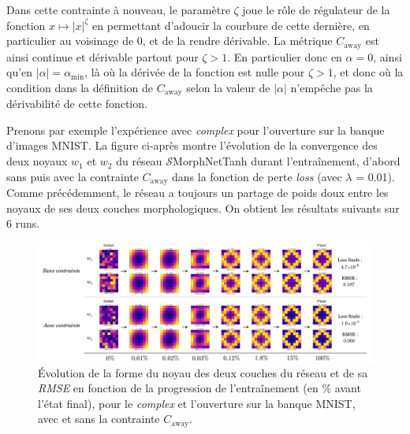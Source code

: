 \vspace{5.0mm}
\noindent Dans cette contrainte à nouveau, le paramètre $\zeta$ joue le rôle de régulateur de la fonction $x \mapsto |x|^\zeta$ en permettant d'adoucir la courbure de cette dernière, en particulier au voisinage de $0$, et de la rendre dérivable.
La métrique $C_\text{away}$ est ainsi continue et dérivable partout pour $\zeta > 1$. En particulier donc en $\alpha = 0$, ainsi qu'en $|\alpha| = \alpha_\text{min}$, là où la dérivée de la fonction est nulle pour $\zeta > 1$, et donc où la condition dans la définition de $C_\text{away}$ selon la valeur de $|\alpha|$ n'empêche pas la dérivabilité de cette fonction.


\newpage

Prenons par exemple l’expérience avec \textit{complex} pour l'ouverture sur la banque d'images MNIST. La figure ci-après montre l’évolution de la convergence des deux noyaux $w_1$ et $w_2$ du réseau $\mathcal{S}$MorphNetTanh durant l’entraînement, d'abord sans puis avec la contrainte $C_\text{away}$ dans la fonction de perte \textit{loss} (avec $\lambda$ = 0.01).
Comme précédemment, le réseau a toujours un partage de poids doux entre les noyaux de ses deux couches morphologiques. On obtient les résultats suivants sur 6 runs. \\


\vspace{1.0mm}
\begin{figure}[htp]
  \begin{center}
    \includegraphics[width=1.00\linewidth]{parts/3-contributions/C-contraintes_geometriques/figures/k_away.pdf}
    \vspace{-4.0mm}
    \caption{ \centering Évolution de la forme du noyau des deux couches du réseau et de sa \textit{RMSE} en fonction de la progression de l'entraînement (en \% avant l'état final), pour le \textit{complex} et l'ouverture sur la banque MNIST, avec et sans la contrainte $C_\text{away}$.}
    \label{fig:c_away}
  \end{center}
\end{figure}


